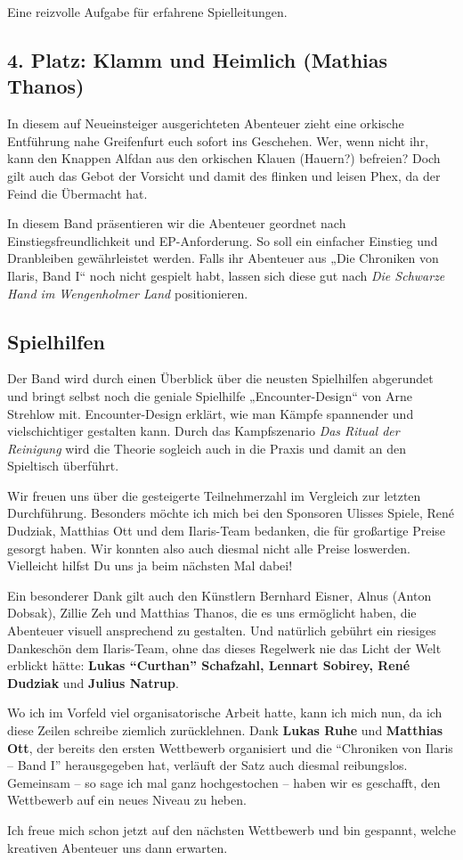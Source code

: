Eine reizvolle Aufgabe für erfahrene Spielleitungen.

\neuespalte

\subsection*{4. Platz: Klamm und Heimlich (Mathias Thanos)}
In diesem auf Neueinsteiger ausgerichteten Abenteuer zieht eine orkische Entführung nahe Greifenfurt euch sofort ins Geschehen. Wer, wenn nicht ihr, kann den Knappen Alfdan aus den orkischen Klauen (Hauern?) befreien? Doch gilt auch das Gebot der Vorsicht und damit des flinken und leisen Phex, da der Feind die Übermacht hat.

\medskip

In diesem Band präsentieren wir die Abenteuer geordnet nach Einstiegsfreundlichkeit und EP-Anforderung. So soll ein einfacher Einstieg und Dranbleiben gewährleistet werden. Falls ihr Abenteuer aus „Die Chroniken von Ilaris, Band I“ noch nicht gespielt habt, lassen sich diese gut nach \textit{Die Schwarze Hand im Wengenholmer Land} positionieren.
\bigskip

\subsection*{Spielhilfen}
Der Band wird durch einen Überblick über die neusten Spielhilfen abgerundet und bringt selbst noch die geniale Spielhilfe „Encounter-Design“ von Arne Strehlow mit. Encounter-Design erklärt, wie man Kämpfe spannender und vielschichtiger gestalten kann. Durch das Kampfszenario \textit{Das Ritual der Reinigung} wird die Theorie sogleich auch in die Praxis und damit an den Spieltisch überführt.%

Wir freuen uns über die gesteigerte Teilnehmerzahl im Vergleich zur letzten Durchführung.
Besonders möchte ich mich bei den Sponsoren Ulisses Spiele, René Dudziak, Matthias Ott und dem Ilaris-Team bedanken, die für großartige Preise gesorgt haben. Wir konnten also auch diesmal nicht alle Preise loswerden.
Vielleicht hilfst Du uns ja beim nächsten Mal dabei!

Ein besonderer Dank gilt auch den Künstlern Bernhard Eisner, Alnus (Anton Dobsak), Zillie Zeh und Matthias Thanos, die es uns ermöglicht haben, die Abenteuer visuell ansprechend zu gestalten.
Und natürlich gebührt ein riesiges Dankeschön dem Ilaris-Team, ohne das dieses Regelwerk nie das Licht der Welt erblickt hätte:
\textbf{Lukas \enquote{Curthan} Schafzahl, Lennart Sobirey, René Dudziak} und \textbf{Julius Natrup}.

Wo ich im Vorfeld viel organisatorische Arbeit hatte, kann ich mich nun, da ich diese Zeilen schreibe ziemlich zurücklehnen. Dank \textbf{Lukas Ruhe} und \textbf{Matthias Ott}, der bereits den ersten Wettbewerb organisiert und die \enquote{Chroniken von Ilaris -- Band I} herausgegeben hat, verläuft der Satz auch diesmal reibungslos. Gemeinsam – so sage ich mal ganz hochgestochen – haben wir es geschafft, den Wettbewerb auf ein neues Niveau zu heben.

Ich freue mich schon jetzt auf den nächsten Wettbewerb und bin gespannt, welche kreativen Abenteuer uns dann erwarten.

\neueseite